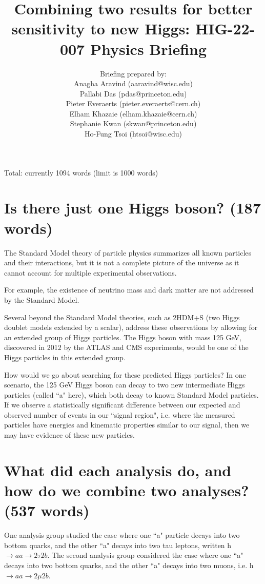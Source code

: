 \documentclass{article}
\title{Combining two results for better sensitivity to new Higgs: HIG-22-007 Physics Briefing}
\author{Briefing prepared by: \\ Anagha Aravind (aaravind@wisc.edu) \\ Pallabi Das (pdas@princeton.edu) \\ Pieter Everaerts (pieter.everaerts@cern.ch) \\ Elham Khazaie (elham.khazaie@cern.ch) \\ Stephanie Kwan (skwan@princeton.edu) \\ Ho-Fung Tsoi (htsoi@wisc.edu)}
\begin{document}
\maketitle

Total: currently 1094 words (limit is 1000 words)

\section{Is there just one Higgs boson? (187 words)}

The Standard Model theory of particle physics summarizes all known particles and their interactions, but it is not a complete picture of the universe as it cannot account for multiple experimental observations. 

For example, the existence of neutrino mass and dark matter are not addressed by the Standard Model. 

Several beyond the Standard Model theories, such as 2HDM+S (two Higgs doublet models extended by a scalar), address these observations by allowing for an extended group of Higgs particles. The Higgs boson with mass 125 GeV, 
discovered in 2012 by the ATLAS and CMS experiments, would be one of the Higgs particles in this extended group. 

How would we go about searching for these predicted Higgs particles? In one scenario, the 125 GeV Higgs boson can decay to two new intermediate Higgs particles (called ``a" here),
which both decay to known Standard Model particles. If we observe a statistically significant difference between our expected and observed number of events in our ``signal region", i.e. where the measured particles have 
energies and kinematic properties similar to our signal, then we may have evidence of these new particles. 


\section{What did each analysis do, and how do we combine two analyses? (537 words)}

One analysis group studied the case where one ``a" particle decays into two bottom quarks, and the other ``a" decays into two tau leptons, written h $\rightarrow aa \rightarrow 2\tau 2b$.
The second analysis group considered the case where one ``a" decays into two bottom quarks, and the other ``a" decays into two muons, i.e. h $\rightarrow aa \rightarrow 2\mu 2b$. 
\end{document}
